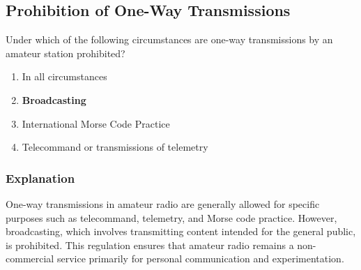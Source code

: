 \subsection{Prohibition of One-Way Transmissions}
\label{T1D02}

\begin{tcolorbox}[colback=gray!10!white,colframe=black!75!black,title=T1D02]
Under which of the following circumstances are one-way transmissions by an amateur station prohibited?
\begin{enumerate}[label=\Alph*,noitemsep]
    \item In all circumstances
    \item \textbf{Broadcasting}
    \item International Morse Code Practice
    \item Telecommand or transmissions of telemetry
\end{enumerate}
\end{tcolorbox}

\subsubsection*{Explanation}
One-way transmissions in amateur radio are generally allowed for specific purposes such as telecommand, telemetry, and Morse code practice. However, broadcasting, which involves transmitting content intended for the general public, is prohibited. This regulation ensures that amateur radio remains a non-commercial service primarily for personal communication and experimentation.